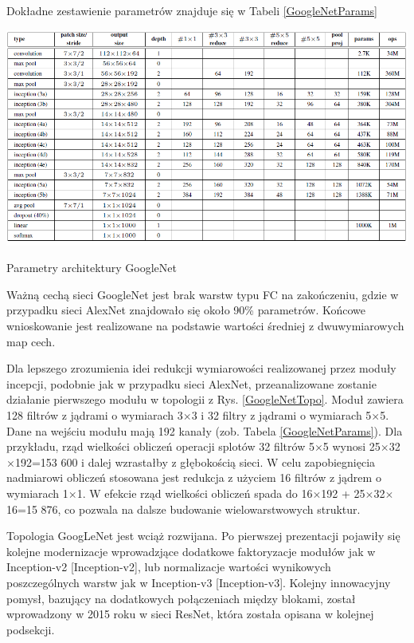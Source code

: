Dokładne zestawienie parametrów znajduje się w Tabeli \ref{GoogleNetParams}

\begin{table}[h!]
	\centering
	\includegraphics[width=1\textwidth]{figures/GoogleNetparams.png}
	\caption{Parametry architektury GoogleNet}
	\label{GoogleNetParams}
\end{table}

Ważną cechą sieci GoogleNet jest brak warstw typu FC na zakończeniu, gdzie w przypadku sieci AlexNet znajdowało się około 90\% parametrów. Końcowe wnioskowanie jest realizowane na podstawie wartości średniej z dwuwymiarowych map cech.

Dla lepszego zrozumienia idei redukcji wymiarowości realizowanej przez moduły incepcji, podobnie jak w przypadku sieci AlexNet, przeanalizowane zostanie działanie pierwszego modułu w topologii z Rys. \ref{GoogleNetTopo}.
Moduł zawiera 128 filtrów z jądrami o wymiarach 3$\times$3 i 32 filtry z jądrami o wymiarach 5$\times$5. Dane na wejściu modułu mają 192 kanały (zob. Tabela \ref{GoogleNetParams}). Dla przykładu, rząd wielkości obliczeń operacji splotów 32 filtrów 5$\times$5 wynosi 25$\times$32$\times$192=153 600 i dalej wzrastałby z głębokością sieci. W celu zapobiegnięcia nadmiarowi obliczeń stosowana jest redukcja z użyciem 16 filtrów z jądrem o wymiarach 1$\times$1. W efekcie rząd wielkości obliczeń spada do 16$\times$192 +  25$\times$32$\times$16=15 876, co pozwala na dalsze budowanie wielowarstwowych struktur.

Topologia GoogLeNet jest wciąż rozwijana. Po pierwszej prezentacji pojawiły się kolejne modernizacje wprowadzjące dodatkowe faktoryzacje modułów jak w Inception-v2 [Inception-v2], lub normalizacje wartości wynikowych poszczególnych warstw jak w Inception-v3 [Inception-v3]. Kolejny innowacyjny pomysł, bazujący na dodatkowych połączeniach między blokami, został wprowadzony w 2015 roku w sieci ResNet, która została opisana w kolejnej podsekcji.

